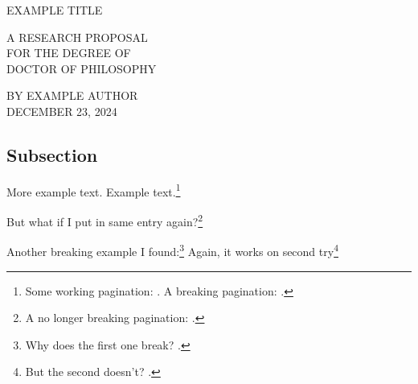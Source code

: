 \documentclass[A4,12pt]{article}
\begin{document}
\hypersetup{pageanchor=false}%
%
\thispagestyle{empty}%
\singlespacing
\begin{center}

  \vfill

  \doublespacing
  \MakeTextUppercase{
    Example Title
  }

  \vfill
  
  \singlespacing
  \MakeTextUppercase{
    A Research Proposal\\
     for the Degree of\\
     Doctor of Philosophy
  }

  \vfill

  \MakeTextUppercase{
    By Example Author\\
    December 23, 2024
  }
  
\end{center}
\restoregeometry
\hypersetup{pageanchor=true}%





\clearpage
{}


%


\subsection{Subsection}

More example text\autocite[See][51]{bakerJubileeMillenniumHoly1998}.
Example text.\footnote{
  Some working pagination: \cites[497]{oswaltBookIsaiahChapters1998}[268-269]{kimReadingIsaiahLiterary2016}. 
  A breaking pagination: \cite[51-55]{bakerJubileeMillenniumHoly1998}. %
}

But what if I put in same entry again?\footnote{
  A no longer breaking pagination: \cite[51-55]{bakerJubileeMillenniumHoly1998}. %
} 


Another breaking example I found:\footnote{
  Why does the first one break? \cite[312]{akagiAcceptabilityPurityActs2024}.
}
Again, it works on second try\footnote{
  But the second doesn't? \cite[312]{akagiAcceptabilityPurityActs2024}.
}

\printbibliography[heading=bibintoc]




\end{document}
